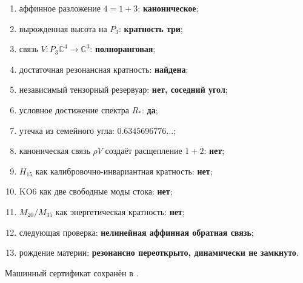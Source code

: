 \begin{protocol}
\begin{enumerate}
 \item аффинное разложение $4=1+3$: \textbf{каноническое};
 \item вырожденная высота на $P_3$: \textbf{кратность три};
 \item связь $V:P_3\mathbb C^4\to\mathbb C^3$:
 \textbf{полноранговая};
 \item достаточная резонансная кратность: \textbf{найдена};
 \item независимый тензорный резервуар: \textbf{нет, соседний угол};
 \item условное достижение спектра $R_*$: \textbf{да};
 \item утечка из семейного угла: \textbf{$0.6345696776\ldots$};
 \item каноническая связь $\rho V$ создаёт расщепление $1+2$:
 \textbf{нет};
 \item $H_{15}$ как калибровочно-инвариантная кратность: \textbf{нет};
 \item KO6 как две свободные моды стока: \textbf{нет};
 \item $M_{20}/M_{35}$ как энергетическая кратность: \textbf{нет};
 \item следующая проверка:
 \textbf{нелинейная аффинная обратная связь};
 \item рождение материи:
 \textbf{резонансно переоткрыто, динамически не замкнуто}.
\end{enumerate}
\end{protocol}

Машинный сертификат сохранён в
.